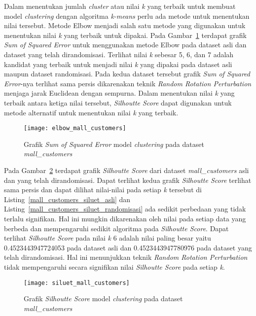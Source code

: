 Dalam menentukan jumlah \textit{cluster} atau nilai \textit{k} yang terbaik untuk membuat model \textit{clustering} dengan algoritma \textit{k-means} perlu ada metode untuk menentukan nilai tersebut. Metode Elbow menjadi salah satu metode yang digunakan untuk  menentukan nilai \textit{k} yang terbaik untuk dipakai. Pada Gambar~\ref{fig:elbow_mall_customers} terdapat grafik \textit{Sum of Squared Error} untuk menggunakan metode Elbow pada dataset asli dan dataset yang telah dirandomisasi. Terlihat nilai \textit{k} sebesar 5, 6, dan 7 adalah kandidat yang terbaik untuk menjadi nilai \textit{k} yang dipakai pada dataset asli maupun dataset randomisasi. Pada kedua dataset tersebut grafik \textit{Sum of Squared Error}-nya terlihat sama persis dikarenakan teknik \textit{Random Rotation Perturbation} menjaga jarak Euclidean dengan sempurna. Dalam menentukan nilai \textit{k} yang terbaik antara ketiga nilai tersebut, \textit{Silhoutte Score} dapat digunakan untuk metode alternatif untuk menentukan nilai \textit{k} yang terbaik.

\begin{figure}
	\centering
	\texttt{[image: elbow\_mall\_customers]}
	\caption{Grafik \textit{Sum of Squared Error} model \textit{clustering} pada dataset \textit{mall\_customers}}
	\label{fig:elbow_mall_customers}
\end{figure}

Pada Gambar~\ref{fig:siluet_mall_customers} terdapat grafik \textit{Silhoutte Score} dari dataset \textit{mall\_customers} asli dan yang telah dirandomisasi. Dapat terlihat kedua grafik \textit{Silhoutte Score} terlihat sama persis dan dapat dilihat nilai-nilai pada setiap \textit{k} tersebut di Listing~\ref{mall_customers_siluet_asli} dan Listing~\ref{mall_customers_siluet_randomisasi} ada sedikit perbedaan yang tidak terlalu signifikan. Hal ini mungkin dikarenakan oleh nilai pada setiap data yang berbeda dan mempengaruhi sedikit algoritma pada \textit{Silhoutte Score}. Dapat terlihat \textit{Silhoutte Score} pada nilai \textit{k} 6 adalah nilai paling besar yaitu 0.4523443947724053 pada dataset asli dan 0.4523443947780976 pada dataset yang telah dirandomisasi. Hal ini menunjukkan teknik \textit{Random Rotation Perturbation} tidak mempengaruhi secara signifikan nilai \textit{Silhoutte Score} pada setiap \textit{k}.

\begin{figure}
	\centering
	\texttt{[image: siluet\_mall\_customers]}
	\caption{Grafik \textit{Silhoutte Score} model \textit{clustering} pada dataset \textit{mall\_customers}}
	\label{fig:siluet_mall_customers}
\end{figure}
	
